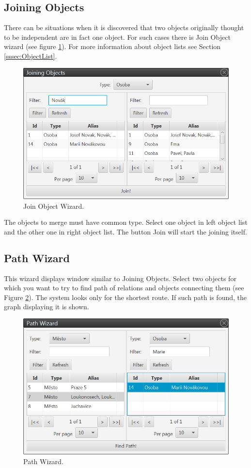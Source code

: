 \subsection{Joining Objects}
\label{ssec:JoinObjects}

There can be situations when it is discovered that two objects originally
thought to be independent are in fact one object. For such cases there is Join
Object wizard (see figure \ref{fig:Join}). For more information about object
lists see Section \ref{sssec:ObjectList}.

\begin{figure}[!htb]
        \centering
        \includegraphics[width=\textwidth]{Images/join}
        \caption{Join Object Wizard.}
        \label{fig:Join}
\end{figure}

The objects to merge must have common type. Select one object in left object
list and the other one in right object list. The button Join will start the
joining itself.

\subsection{Path Wizard}
This wizard displays window similar to Joining Objects. Select two objects
for which you want to try to find path of relations and objects connecting them
(see Figure \ref{fig:Path}). The system looks only for the shortest route.
If such path is found, the graph displaying it is shown.

\begin{figure}[!htb]
        \centering
        \includegraphics[width=\textwidth]{Images/path}
        \caption{Path Wizard.}
        \label{fig:Path}
\end{figure}

